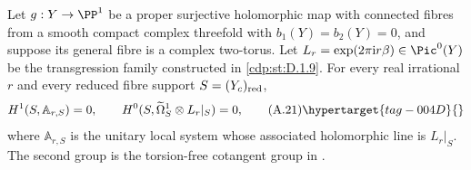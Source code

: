 \begin{proposition}\hypertarget{tag-01AX}{}\label{cdp:st:A.4.8}

Let $g:Y\to\PP^1$ be a proper surjective holomorphic map with connected fibres from a smooth compact complex threefold with $b_1(Y)=b_2(Y)=0$, and suppose its general fibre is a complex two-torus. Let $L_r=\exp(2\pi\mathrm i r\beta)\in\Pic^0(Y)$ be the transgression family constructed in \ref{cdp:st:D.1.9}. For every real irrational $r$ and every reduced fibre support $S=(Y_c)_{\rm red}$,
\[
 H^1(S,\mathbb A_{r,S})=0,
 \qquad
 H^0(S,\widetilde\Omega_S^1\otimes L_r|_S)=0,
 \tag{A.21}\hypertarget{tag-004D}{}\label{cdp:eq:A.21}
\]
where $\mathbb A_{r,S}$ is the unitary local system whose associated holomorphic line is $L_r|_S$. The second group is the torsion-free cotangent group in \cite[Equation~(11), p.~692]{CDP20}.
\end{proposition}


